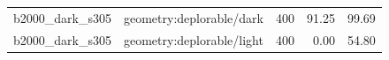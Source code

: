\begin{longtable}{l>{\raggedright\arraybackslash}p{.42\linewidth}rrr}
b2000\_\allowbreak{}dark\_\allowbreak{}s305 & %
geometry:deplorable/dark & %
400 & %
91.25 & %
99.69 \\ %

b2000\_\allowbreak{}dark\_\allowbreak{}s305 & %
geometry:deplorable/light & %
400 & %
0.00 & %
54.80 \\ %


\end{longtable}
